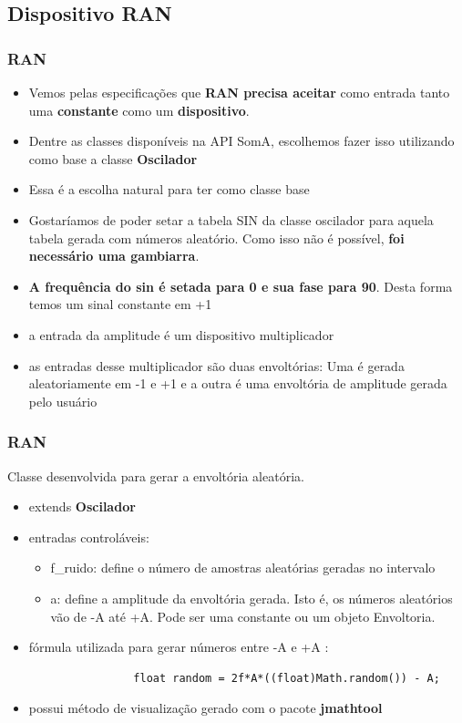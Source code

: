 \documentclass{beamer}
\begin{document}
\subsection{Dispositivo RAN}
\begin{frame}[fragile]
	\frametitle{RAN}
	\begin{itemize}
		\item Vemos pelas especificações que \textbf{RAN precisa aceitar} como entrada
		tanto uma \textbf{constante} como um \textbf{dispositivo}.
		\item Dentre as classes disponíveis na API SomA, escolhemos fazer isso utilizando como base a classe \textbf{Oscilador}
		\item Essa é a escolha natural para ter como classe base
		\item Gostaríamos de poder setar a tabela SIN da classe oscilador
		para aquela tabela gerada com números aleatório. Como isso não é possível,
		\textbf{foi necessário uma gambiarra}.
		\item \textbf{A frequência do sin é setada para 0 e sua fase para 90}. Desta forma temos um sinal constante em +1
		\item a entrada da amplitude é um dispositivo multiplicador
		\item as entradas desse multiplicador são duas envoltórias: Uma é gerada
		aleatoriamente em -1 e +1 e a outra é uma envoltória de amplitude gerada pelo usuário
	\end{itemize}
\end{frame}

\begin{frame}[fragile]
	\frametitle{RAN}
Classe desenvolvida para gerar a envoltória aleatória.	
	\begin{itemize}
		\item extends \textbf{Oscilador}
		\item entradas controláveis: 
		\begin{itemize}
			\item f\_ruido: define o número de amostras aleatórias geradas no intervalo
			\item a: define a amplitude da envoltória gerada. Isto é, os números aleatórios vão de -A até +A. Pode ser uma constante ou um objeto Envoltoria.
		\end{itemize}
		\item fórmula utilizada para gerar números entre -A e +A :
		\begin{tiny}	\begin{lstlisting}
				float random = 2f*A*((float)Math.random()) - A;		    				
		\end{lstlisting} \end{tiny}	
		
		\item possui método de visualização gerado com o pacote \textbf{jmathtool}			
	\end{itemize}
\end{frame}
\end{document}
